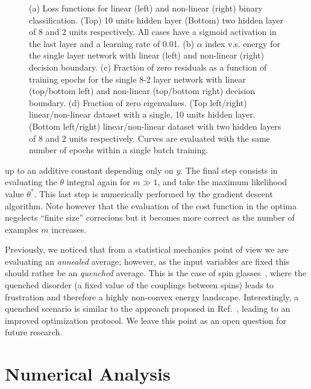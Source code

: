 \documentclass{article}
\begin{document}
\begin{figure}[t!]
	\caption{ \label{fig:index} (a) Loss functions for linear (left) and non-linear (right) binary classification. (Top) 10 units hidden layer (Bottom) two hidden layer of 8 and 2 units respectively. All cases have a sigmoid activation in the last layer and a learning rate of 0.01. (b) $\alpha$ index  v.s. energy for the single layer network with linear (left) and non-linear (right) decision boundary. (c)  Fraction of zero residuals as a function of training epochs for the single 8-2 layer network with linear (top/bottom left) and non-linear (top/bottom right) decision boundary. (d) Fraction of zero eigenvalues. (Top left/right) linear/non-linear dataset with a single, 10 units hidden layer. (Bottom left/right)  linear/non-linear dataset with two hidden layers of 8 and 2 units respectively. Curves are evaluated with the same number of epochs within a single batch training. }
\end{figure}
%
up to an additive constant depending only on $y$. The final step consists in evaluating the $\theta$ integral again for $m \gg 1$, and take the maximum likelihood value $\theta^*$. This last step is numerically performed by the gradient descent algorithm. Note however that the evaluation of the cost function in the optima negelects ``finite size'' correcions but it becomes more correct as the number of examples $m$ increases.

Previously, we noticed that from a statistical mechanics point of view we are evaluating an {\it annealed} average; however, as the input variables are fixed this should rather be an {\it quenched} average. This is the case of spin glasses~\cite{parisi2, giardina}, where the quenched disorder (a fixed value of the couplings between spins) leads to frustration and therefore a highly non-convex energy landscape. Interestingly, a quenched scenario is similar to the approach proposed in Ref.~\cite{pratik}, leading to an improved optimization protocol. We leave this point as an open question for future research.

\section{Numerical Analysis}
\end{document}
